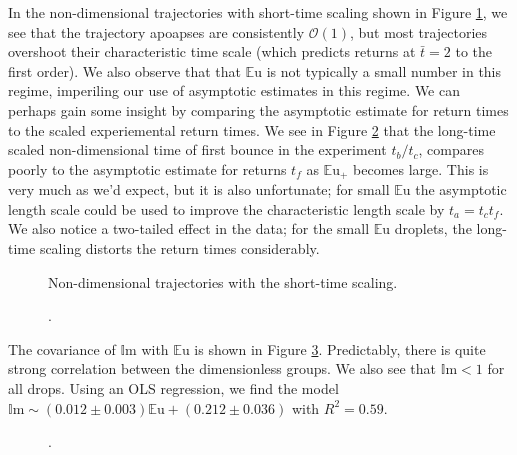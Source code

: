 \documentclass[12pt,a4paper,oneside]{book}
\begin{document}
In the non-dimensional trajectories with short-time scaling shown in Figure \ref{fig:series_s_ds}, we see that the trajectory apoapses are consistently $\mathcal{O}(1)$, but most trajectories overshoot their characteristic time scale (which predicts returns at $\bar{t}  =2$ to the first order). We also observe that that $\mathbb{E}\mbox{u}$ is not typically a small number in this regime, imperiling our use of asymptotic estimates in this regime. We can perhaps gain some insight by comparing the asymptotic estimate for return times to the scaled experiemental return times. We see in Figure \ref{fig:times} that the long-time scaled non-dimensional time of first bounce in the experiment $t_b / t_c$, compares poorly to the asymptotic estimate for returns $t_f$ as $\mathbb{E}\mbox{u}_+$ becomes large. This is very much as we'd expect, but it is also unfortunate; for small $\mathbb{E}\mbox{u}$ the asymptotic length scale could be used to improve the characteristic length scale by $t_a = t_c t_f$. We also notice a two-tailed effect in the data; for the small $\mathbb{E}\mbox{u}$ droplets, the long-time scaling distorts the return times considerably.   
\begin{figure}[htb]
    \centering
    
    \caption{Non-dimensional trajectories with the short-time scaling.\label{fig:series_s_ds}}
\end{figure}

\begin{figure}[htb]
    \centering
    
    \caption{.\label{fig:times}}
\end{figure}

The covariance of $\mathbb{I}\mbox{m}$ with $\mathbb{E}\mbox{u}$ is shown in Figure \ref{fig:dnumbs}. Predictably, there is quite strong correlation between the dimensionless groups. We also see that $\mathbb{I}\mbox{m} < 1$ for all drops. Using an OLS regression, we find the model $\mathbb{I}\mbox{m} \sim (0.012 \pm 0.003) \mathbb{E}\mbox{u} + (0.212 \pm 0.036) $ with $R^2 =0.59$.
\begin{figure}[htb]
    \centering
    
    \caption{.\label{fig:dnumbs}}
\end{figure}
\end{document}
